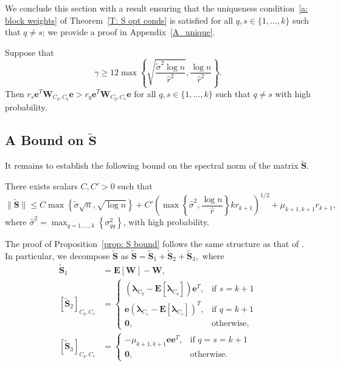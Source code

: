 \documentclass[twoside,11pt]{article}
\newcommand{\E}{\mathbf{E}}
\newcommand{\St}{\bs{\tilde S}}
\newcommand{\e}{\bs {e}}
\newcommand{\bs}{\boldsymbol}
\newcommand{\W}{\bs {W}}
\newcommand{\0}{\bs{0}}
\newcommand{\sbra}[1] {\ensuremath{ \left[ #1\right]}} %
\newcommand{\rbra}[1]{\ensuremath{\left( #1 \right)}} %
\newcommand{\bra}[1]{\ensuremath{\left\{ #1 \right\}}} %
\begin{document}
{%
We conclude this section with a result ensuring that the uniqueness condition~\eqref{a: block weights} of
Theorem~\ref{T: S opt conds}
is satisfied for all \(q, s\in \{1,\dots, k\}\) such that \(q \neq s\);
we provide a proof in Appendix~\ref{A_unique}.

\begin{proposition}
\label{prop:unique}%
	Suppose that
	\begin{equation} \label{eq: unique bound}
		\gamma \ge
		12 \max \bra{ \sqrt{ \frac{\tilde \sigma^2 \log n}{\hat r^2}},
		\frac{\log n}{\hat r^2} }.
	\end{equation}
	Then \(r_s \e^T \W_{C_q, C_q} \e > r_q \e^T \W_{C_q, C_s} \e \)
	for all \(q,s \in \{1,\dots, k\}\) such that \(q \neq s\) with high probability.
\end{proposition}

\subsection{A Bound on \(\bs{\tilde S}\)}
\label{sec: S}
It remains to establish the following bound on the spectral norm of the matrix \(\St\).

\begin{proposition} \label{prop: S bound}
	There exists scalars $C, C' > 0$ such that
	\begin{equation} \label{eq: S bound}
	\|\St\| \leq C   \max  \bra {\tilde \sigma\sqrt{n},  \sqrt{\log n}}
	+ C' \rbra{ \max \bra{\hat\sigma^2, \frac{\log n}{\hat r} } k r_{k+1} }^{1/2}
	+ \mu_{k+1, k+1} r_{k+1},
\end{equation}
	where $\hat \sigma^2 = \max_{q=1,\dots,k}\bra{\sigma^{2}_{qq}}$,
	with high probability.
\end{proposition}

The proof of Proposition~\ref{prop: S bound} follows the same structure as that of  \citet[Lemma~4.5]{ames2014guaranteed}.
In particular, we decompose \(\St\) as \(\St = \St_1 + \St_2 + \St_3,\) where
\begin{align}
\St_1 & = \E[ \W ] - \W,  \label{eq: St1 def}\\
[\St_2]_{C_q, C_s} & =
\begin{cases}  \left(\bs{\lambda}_{C_q}-\E\sbra{\bs{\lambda}_{C_q}}\right)\bs{e}^T,
& \mbox{if } s = k+1 \\
\bs{e}\left(\bs{\lambda}_{C_s}-\E\sbra{\bs{\lambda}_{C_s}}\right)^T, & \mbox{if } q = k+1  \\
\bs{0}, & \mbox{otherwise, }\end{cases} \label{eq: St2 def} \\
[\St_3]_{C_q, C_s} &= 	\begin{cases} -\mu_{k+1, k+1} \bs{e}\bs{e}^T, & \mbox{if } q=s=k+1 \\
\bs{0}, & \mbox{otherwise.} \end{cases}
\end{align}

}
\end{document}
